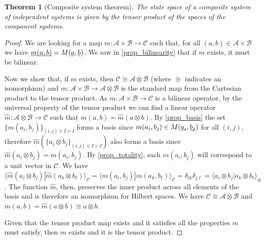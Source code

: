 \documentclass[aps,prl,amsmath,amssymb,twocolumn,nofootinbib]{revtex4}
\theoremstyle{plain}
\newtheorem{thrm}{Theorem}[section]
\theoremstyle{definition}
\theoremstyle{remark}
\newcommand{\pj}[1] {\underbar{$#1$}}
\def\>{\rangle}
\def\<{\langle}
\begin{document}
\begin{thrm}[Composite system theorem]\label{theo}
  The state space of a composite system of independent systems is given by the tensor product of the spaces of the component systems.
\end{thrm}

\begin{proof}
We are looking for a map $m : \mathcal{A} \times \mathcal{B} \to \mathcal{C}$ such that, for all $(a,b) \in \mathcal{A} \times \mathcal{B}$ we have $\pj{m(a,b)} = M(\pj{a}, \pj{b})$. We saw in \ref{prop_bilinearity} that if $m$ exists, it must be bilinear.

Now we show that, if $m$ exists, then $\mathcal{C} \cong \mathcal{A}
\otimes \mathcal{B}$ (where $\cong$ indicates an isomorphism) and $m :
\mathcal{A} \times \mathcal{B} \to \mathcal{A} \otimes \mathcal{B}$ is
the standard map from the Cartesian product to the tensor product. As $m
: \mathcal{A} \times \mathcal{B} \to \mathcal{C}$ is a bilinear
operator, by the universal property of the tensor product we can find
a linear operator $\hat{m} : \mathcal{A} \otimes \mathcal{B} \to
\mathcal{C}$ such that $m(a, b) = \hat{m}(a \otimes b)$. By
\ref{prop_basis} the set $\{ m(a_i, b_j)\}_{(i,j) \in I \times J}$
forms a basis since $ m(a_i, b_j) \in M(\pj{a_i}, \pj{b_j})$ for all
$(i, j)$, therefore $\hat{m}(\{ a_i \otimes b_j\}_{(i,j) \in I \times
  J})$ also forms a basis since $\hat{m}(a_i\otimes b_j)=m(a_i, b_j)$.
By \ref{prop_totality}, each $m(a_i,b_j)$ will correspond to a unit
vector in $\mathcal{C}$. We have $\<\hat m(a_i\otimes b_j)| \hat
m(a_k\otimes b_\ell)\>_\mathcal{C} =\<m(a_i, b_j)| m(a_k,
b_\ell)\>_\mathcal{C} = \delta_{ik}\delta_{j\ell} = \<a_i\otimes b_j|
a_k \otimes b_\ell\>_{\otimes}$. The function $\hat{m}$, then,
preserves the inner product across all elements of the basis and is
therefore an isomorphism for Hilbert spaces. We have $\mathcal{C}
\cong \mathcal{A} \otimes \mathcal{B}$ and $m(a, b) = \hat{m}(a
\otimes b) \cong a \otimes b$.

Given that the tensor product map exists and it satisfies all the properties $m$ must satisfy, then $m$ exists and it is the tensor product.
\end{proof}
\end{document}
